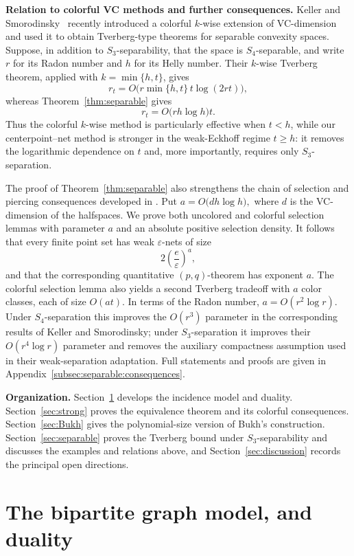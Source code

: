 \documentclass[11pt]{article}
\theoremstyle{definition}
\begin{document}
\medskip
\noindent\textbf{Relation to colorful VC methods and further consequences.}
Keller and Smorodinsky~\cite{keller2026colorful} recently introduced a
colorful $k$-wise extension of VC-dimension and used it to obtain
Tverberg-type theorems for separable convexity spaces. Suppose, in
addition to $S_3$-separability,
that the space is $S_4$-separable, and write $r$ for its Radon number
and $h$ for its Helly number. Their $k$-wise Tverberg theorem, applied
with $k=\min\{h,t\}$, gives
\[
 r_t=O\bigl(r\min\{h,t\}\,t\log(2rt)\bigr),
\]
whereas Theorem~\ref{thm:separable} gives
\[
 r_t=O\bigl(rh\log h\bigr)t.
\]
Thus the colorful $k$-wise method is particularly effective when
$t<h$, while our centerpoint--net method is stronger in the
weak-Eckhoff regime $t\ge h$: it removes the logarithmic dependence on
$t$ and, more importantly, requires only $S_3$-separation.

The proof of Theorem~\ref{thm:separable} also strengthens the chain of
selection and piercing consequences developed in
\cite{keller2026colorful}. Put
 $a=O\bigl(dh\log h\bigr),$
where $d$ is the VC-dimension of the halfspaces. We prove both
uncolored and colorful selection lemmas with parameter $a$ and an
absolute positive selection density. It follows that every finite
point set has weak $\varepsilon$-nets of size
\[
 2\left(\frac e\varepsilon\right)^a,
\]
and that the corresponding quantitative $(p,q)$-theorem has exponent
$a$. The colorful selection lemma also yields a second Tverberg
tradeoff with $a$ color classes, each of size $O(at)$. In terms of the
Radon number, $a=O(r^2\log r)$. Under $S_4$-separation this improves
the $O(r^3)$ parameter in the corresponding results of Keller and
Smorodinsky; under $S_3$-separation it improves their
$O(r^4\log r)$ parameter and removes the auxiliary compactness
assumption used in their weak-separation adaptation. Full statements
and proofs are given in
Appendix~\ref{subsec:separable:consequences}.

\medskip
\noindent\textbf{Organization.}
Section~\ref{sec:bipartite} develops the incidence model and duality. Section~\ref{sec:strong} proves the equivalence theorem and its colorful consequences. Section~\ref{sec:Bukh} gives the polynomial-size version of Bukh's construction. Section~\ref{sec:separable} proves the Tverberg bound under $S_3$-separability and discusses the examples and relations above, and Section~\ref{sec:discussion} records the principal open directions.
\section{The bipartite graph model, and duality}\label{sec:bipartite}
\end{document}
